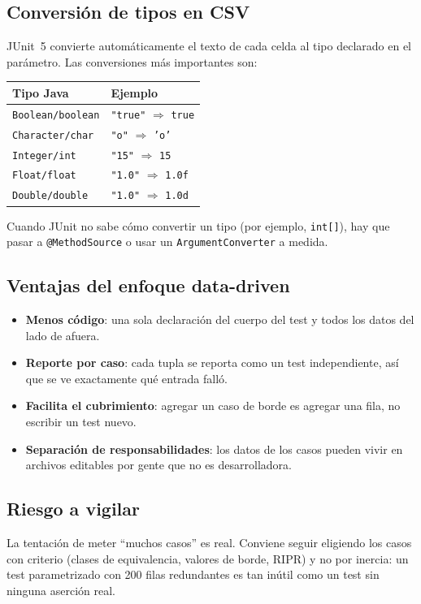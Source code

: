 \documentclass[12pt,a4paper]{article}
\begin{document}
\subsection{Conversión de tipos en CSV}
JUnit~5 convierte automáticamente el texto de cada celda al tipo declarado en el parámetro. Las conversiones más importantes son:
\begin{center}
\begin{tabular}{ll}
\toprule
Tipo Java                  & Ejemplo \\
\midrule
\texttt{Boolean/boolean}   & \texttt{"true"} $\Rightarrow$ \texttt{true} \\
\texttt{Character/char}    & \texttt{"o"} $\Rightarrow$ \texttt{'o'}  \\
\texttt{Integer/int}       & \texttt{"15"} $\Rightarrow$ \texttt{15} \\
\texttt{Float/float}       & \texttt{"1.0"} $\Rightarrow$ \texttt{1.0f} \\
\texttt{Double/double}     & \texttt{"1.0"} $\Rightarrow$ \texttt{1.0d} \\
\bottomrule
\end{tabular}
\end{center}
Cuando JUnit no sabe cómo convertir un tipo (por ejemplo, \texttt{int[]}), hay que pasar a \texttt{@MethodSource} o usar un \texttt{ArgumentConverter} a medida.

\subsection{Ventajas del enfoque data-driven}
\begin{itemize}
  \item \textbf{Menos código}: una sola declaración del cuerpo del test y todos los datos del lado de afuera.
  \item \textbf{Reporte por caso}: cada tupla se reporta como un test independiente, así que se ve exactamente qué entrada falló.
  \item \textbf{Facilita el cubrimiento}: agregar un caso de borde es agregar una fila, no escribir un test nuevo.
  \item \textbf{Separación de responsabilidades}: los datos de los casos pueden vivir en archivos editables por gente que no es desarrolladora.
\end{itemize}

\subsection{Riesgo a vigilar}
La tentación de meter ``muchos casos'' es real. Conviene seguir eligiendo los casos con criterio (clases de equivalencia, valores de borde, RIPR) y no por inercia: un test parametrizado con 200 filas redundantes es tan inútil como un test sin ninguna aserción real.
\end{document}
